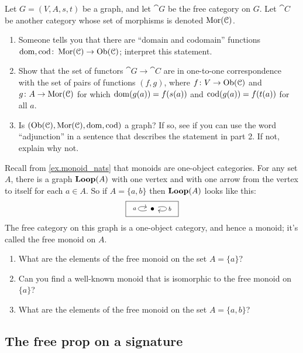 \documentclass[7Sketches]{subfiles}
\begin{document}
\begin{exercise}%
\label{exc.free_cat_is_free}
Let $G=(V,A,s,t)$ be a graph, and let $\cat{G}$ be the free category on $G$. Let $\cat{C}$ be another category whose set of morphisms is denoted $\operatorname{Mor}(\mathcal{C})$. 
\begin{enumerate}
	\item Someone tells you that there are ``domain and codomain'' functions $\operatorname{dom},\operatorname{cod}\colon\operatorname{Mor}(\mathcal{C})\to\operatorname{Ob}(\mathcal{C})$; interpret this statement.
	\item Show that the set of functors $\cat{G} \to
\cat{C}$ are in one-to-one correspondence with the set of pairs of functions
$(f,g)$, where $f\colon V \to \operatorname{Ob}(\mathcal{C})$ and $g\colon A\to\operatorname{Mor}(\mathcal{C})$ for which $\operatorname{dom}(g(a))=f(s(a))$ and $\operatorname{cod}(g(a))=f(t(a))$ for all $a$.
	\item Is $(\operatorname{Ob}(\mathcal{C}),\operatorname{Mor}(\mathcal{C}),\operatorname{dom},\operatorname{cod})$ a graph? If so, see if you can use the word ``adjunction'' in a sentence that describes the statement in part 2. If not, explain why not.
\qedhere
\end{enumerate}
\end{exercise}

\begin{exercise}%
%
%
\label{exc.free_monoid}
Recall from \cref{ex.monoid_nats} that monoids are one-object categories. For any set $A$, there is a graph $\mathbf{Loop}(A)$ with one vertex and with one arrow from the vertex to itself for each $a\in A$. So if $A=\{a,b\}$ then $\mathbf{Loop}(A)$ looks like this:
\[
\fbox{
\begin{tikzcd}[ampersand replacement=\&]
	\bullet\ar[loop left, "a"]\ar[loop right, "b"]
\end{tikzcd}
}
\]
The free category on this graph is a one-object category, and hence a monoid; it's called the free monoid on $A$.
\begin{enumerate}
	\item What are the elements of the free monoid on the set $A=\{a\}$?
	\item Can you find a well-known monoid that is isomorphic to the free monoid on $\{a\}$?%
	\item What are the elements of the free monoid on the set $A=\{a,b\}$?
\qedhere
\end{enumerate}
\end{exercise}



\subsection{The free prop on a signature}
\end{document}

